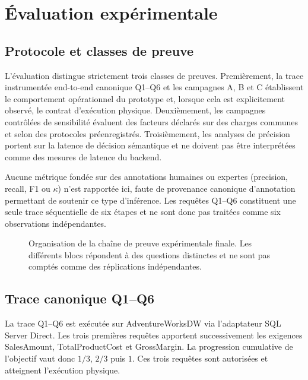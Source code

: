 \section{Évaluation expérimentale}
\label{sec:evaluation-experimentale}
\label{sec:exp}
\label{sec:experiments}

\subsection{Protocole et classes de preuve}

L'évaluation distingue strictement trois classes de preuves.
Premièrement, la trace instrumentée end-to-end canonique Q1--Q6 et
les campagnes A, B et C établissent le comportement opérationnel du
prototype et, lorsque cela est explicitement observé, le contrat
d'exécution physique. Deuxièmement, les campagnes contrôlées de
sensibilité évaluent des facteurs déclarés sur des charges communes
et selon des protocoles préenregistrés. Troisièmement, les analyses de
précision portent sur la latence de décision sémantique et ne doivent
pas être interprétées comme des mesures de latence du backend.

Aucune métrique fondée sur des annotations humaines ou expertes
(precision, recall, F1 ou $\kappa$) n'est rapportée ici, faute de
provenance canonique d'annotation permettant de soutenir ce type
d'inférence. Les requêtes Q1--Q6 constituent une seule trace
séquentielle de six étapes et ne sont donc pas traitées comme six
observations indépendantes.

\begin{figure}[!t]
\centering
\resizebox{0.96\textwidth}{!}{}
\caption{Organisation de la chaîne de preuve expérimentale finale. Les différents blocs répondent à des questions distinctes et ne sont pas comptés comme des réplications indépendantes.}
\label{fig:v4-evidence-chain}
\end{figure}

\subsection{Trace canonique Q1--Q6}

La trace Q1--Q6 est exécutée sur AdventureWorksDW via l'adaptateur
SQL Server Direct. Les trois premières requêtes apportent
successivement les exigences SalesAmount, TotalProductCost et
GrossMargin. La progression cumulative de l'objectif vaut donc
$1/3$, $2/3$ puis $1$. Ces trois requêtes sont autorisées et atteignent
l'exécution physique.

